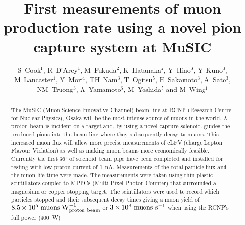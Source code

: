 \documentclass[a4paper]{jpconf}
\begin{document}
\title{First measurements of muon production rate using a novel pion capture system at MuSIC}

\author{S~Cook$^1$, R~D'Arcy$^1$, M~Fukuda$^2$, K~Hatanaka$^2$, Y~Hino$^3$, Y~Kuno$^3$, M~Lancaster$^1$, Y~Mori$^4$, TH~Nam$^3$, T~Ogitsu$^5$, H~Sakamoto$^3$, A~Sato$^3$, NM~Truong$^3$, A~Yamamoto$^5$, M~Yoshida$^5$ and M~Wing$^1$}

\address{$^1$Department of Physics and Astronomy, University College London, Gower Street, London WC1E~6BT, UK}
\address{$^2$Research Centre for Nuclear Physics, 10-1 Mihogaoka, Ibaraki, Osaka~567-0047, Japan}
\address{$^3$Department of Physics, Graduate School of Science, Osaka University, 1-1 Machikane, Toyonaka, Osaka 590-0043 Japan}
\address{$^4$Kyoto Research Reactor Institute, 2 Asashiro-Nishi, Kumatori-cho, Sennangu, Osaka 590-0494, Japan}
\address{$^5$High Energy Accelerator Research Organisation, KEK, 1-1 Oho, Tsukuba, Ibaragi 305-0801, Japan}


\begin{abstract}
The MuSIC (Muon Science Innovative Channel) beam line at RCNP (Research Centre for Nuclear Physics), Osaka will be the most intense source of muons in the world. A proton beam is incident on a target and, by using a novel capture solenoid, guides the produced pions into the beam line where they subsequently decay to muons. This increased muon flux will allow more precise measurements of cLFV (charge Lepton Flavour Violation) as well as making muon beams more economically feasible. Currently the first 36$^{\circ}$ of solenoid beam pipe have been completed and installed for testing with low proton current of 1~nA. Measurements of the total particle flux and the muon life time were made. The measurements were taken using thin plastic scintillators coupled to MPPCs (Multi-Pixel Photon Counter) that surrounded a magnesium or copper stopping target. The scintillators were used to record which particles stopped and their subsequent decay times giving a muon yield of $8.5\times 10^5 \rm{~muons} \rm{~W}^{-1}_{\rm{proton~beam}}$ or $3\times 10^8 \rm{~muons} \rm{~s}^{-1}$ when using the RCNP's full power (400~W).
\\
\\ 

\end{abstract}    
\end{document}
